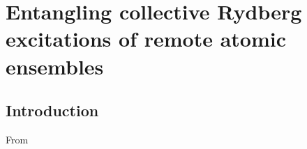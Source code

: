 \chapter{Entangling collective Rydberg excitations of remote atomic ensembles}
\label{ch:Komar2015}

\section{Introduction}
From \cite{}
